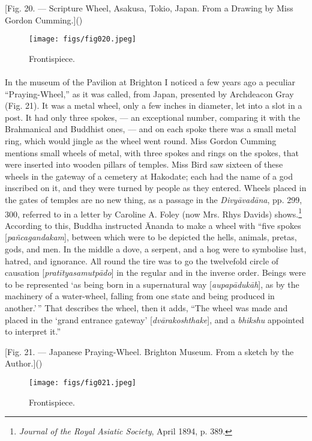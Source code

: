 \documentclass[a4paper, 11pt, oneside, polutonikogreek, english]{article}
\begin{document}
[Fig. 20. --- Scripture Wheel, Asakusa, Tokio, Japan. From a Drawing by Miss Gordon Cumming.]()
\begin{figure}[H]
\centering
\texttt{[image: figs/fig020.jpeg]}
\caption{Frontispiece.}
\end{figure}
\paragraph{}
In the museum of the Pavilion at Brighton I noticed a few years ago a peculiar ``Praying-Wheel,'' as it was called, from Japan, presented by Archdeacon Gray (Fig. 21). It was a metal wheel, only a few inches in diameter, let into a slot in a post. It had only three spokes, --- an exceptional number, comparing it with the Brahmanical and Buddhist ones, --- and on each spoke there was a small metal ring, which would jingle as the wheel went round. Miss Gordon Cumming mentions small wheels of metal, with three spokes and rings on the spokes, that were inserted into wooden pillars of temples. Miss Bird saw sixteen of these wheels in the gateway of a cemetery at Hakodate; each had the name of a god inscribed on it, and they were turned by people as they entered. Wheels placed in the gates of temples are no new thing, as a passage in the \emph{Divyāvadāna}, pp. 299, 300, referred to in a letter by Caroline A. Foley (now Mrs. Rhys Davids) shows.\footnote{\emph{Journal of the Royal Asiatic Society}, April 1894, p. 389.} According to this, Buddha instructed Ānanda to make a wheel with ``five spokes [\emph{pañcagandakam}], between which were to be depicted the hells, animals, pretas, gods, and men. In the middle a dove, a serpent, and a hog were to symbolise lust, hatred, and ignorance. All round the tire was to go the twelvefold circle of causation [\emph{pratītyasamutpādo}] in the regular and in the inverse order. Beings were to be represented `as being born in a supernatural way [\emph{aupapādukāh}], as by the machinery of a water-wheel, falling from one state and being produced in another.'\,'' That describes the wheel, then it adds, ``The wheel was made and placed in the `grand entrance gateway' [\emph{dvārakoshthake}], and a \emph{bhikshu} appointed to interpret it.''

[Fig. 21. --- Japanese Praying-Wheel. Brighton Museum. From a sketch by the Author.]()
\begin{figure}[H]
\centering
\texttt{[image: figs/fig021.jpeg]}
\caption{Frontispiece.}
\end{figure}
\end{document}
